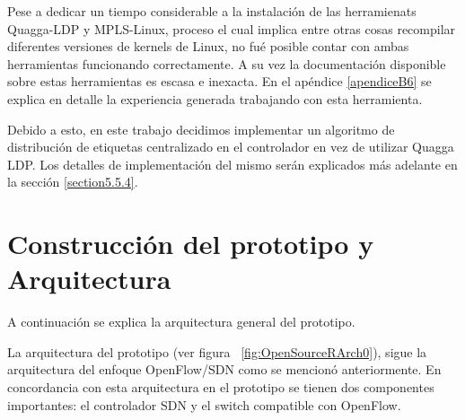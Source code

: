 Pese a dedicar un tiempo considerable a la instalaci\'on de las herramienats Quagga-LDP y MPLS-Linux, proceso el cual implica entre otras cosas recompilar diferentes versiones de kernels de Linux, no fu\'e posible contar con ambas herramientas funcionando correctamente. A su vez la documentaci\'on disponible sobre estas herramientas es escasa e inexacta. En el apéndice \ref{apendiceB6} se explica en detalle la experiencia generada trabajando con esta herramienta.



Debido a esto, en este trabajo decidimos implementar un algoritmo de distribución de etiquetas centralizado en el controlador en vez de utilizar Quagga LDP. Los detalles de implementaci\'on del mismo ser\'an explicados m\'as adelante en la sección \ref{section5.5.4}.\\

\section{Construcci\'on del prototipo y Arquitectura}

A continuación se explica la arquitectura general del prototipo. 

La arquitectura del prototipo (ver figura ~\ref{fig:OpenSourceRArch0}), sigue la arquitectura del enfoque OpenFlow/SDN como se mencion\'o anteriormente. En concordancia con esta arquitectura en el prototipo se tienen dos componentes importantes: el controlador SDN y el switch compatible con OpenFlow.\\

